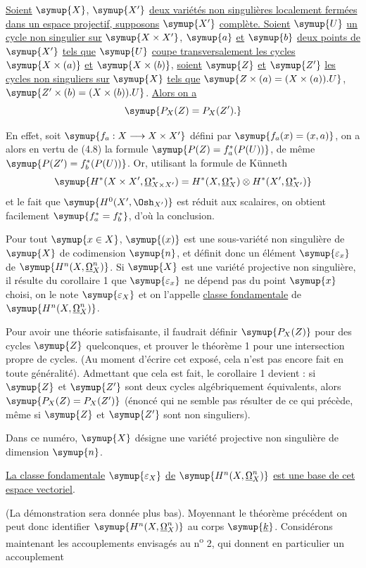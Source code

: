  \uline{Soient} $\symup{X}$, $\symup{X'}$ \uline{deux variétés non singulières
localement fermées dans un espace projectif, supposons} $\symup{X'}$ \uline{complète. Soient} $\symup{U}$
\uline{un cycle non singulier sur} $\symup{X\times X'}$, $\symup{a}$ \uline{et} $\symup{b}$ \uline{deux points de} $\symup{X'}$ \uline{tels que}
$\symup{U}$ \uline{coupe transversalement les cycles} $\symup{X\times(a)}$ \uline{et} $\symup{X\times(b)}$, \uline{soient} $\symup{Z}$
\uline{et} $\symup{Z'}$ \uline{les cycles non singuliers sur} $\symup{X}$ \uline{tels que}
$\symup{Z\times(a)=(X\times(a)).U}$, $\symup{Z'\times(b)=(X\times(b)).U}$.
\uline{Alors on a}
\[
  \symup{P_X(Z)=P_X(Z').}
\]

En effet, soit $\symup{f_a:X\longrightarrow X\times X'}$ défini par
$\symup{f_a(x)=(x,a)}$, on a alors en vertu de (4.8) la formule
$\symup{P(Z)=f_a^{*}(P(U))}$, de même $\symup{P(Z')=f_b^{*}(P(U))}$. Or, utilisant la formule de
Künneth
\[
  \symup{H^{*}(X\times X',\underline{\Omega}_{X\times X'}^{*})
  =H^{*}(X,\underline{\Omega}_X^{*})\otimes H^{*}(X',\underline{\Omega}_{X'}^{*})}
\]
et le fait que $\symup{H^{0}(X',\Osh_{X'})}$ est réduit aux scalaires, on obtient
facilement $\symup{f_a^{*}=f_b^{*}}$, d'où la conclusion.

Pour tout $\symup{x\in X}$, $\symup{(x)}$ est une sous-variété non singulière de $\symup{X}$ de
codimension $\symup{n}$, et définit donc un élément $\symup{\varepsilon_x}$ de
$\symup{H^{n}(X,\underline{\Omega}_X^{n})}$. Si $\symup{X}$ est une variété projective non singulière, il
résulte du corollaire 1 que $\symup{\varepsilon_x}$ ne dépend pas du point $\symup{x}$ choisi, on
le note $\symup{\varepsilon_X}$ et on l'appelle \uline{classe fondamentale} de
$\symup{H^{n}(X,\underline{\Omega}_X^{n})}$.

 Pour avoir une théorie satisfaisante, il faudrait définir
$\symup{P_X(Z)}$ pour des cycles $\symup{Z}$ quelconques, et prouver le théorème 1 pour une
intersection propre de cycles. (Au moment d'écrire cet exposé, cela n'est pas
encore fait en toute généralité). Admettant que cela est fait, le corollaire 1
devient : si $\symup{Z}$ et $\symup{Z'}$ sont deux cycles algébriquement équivalents, alors
$\symup{P_X(Z)=P_X(Z')}$ (énoncé qui ne semble pas résulter de ce qui précède, même si
$\symup{Z}$ et $\symup{Z'}$ sont non singuliers).


Dans ce numéro, $\symup{X}$ désigne une variété projective non singulière de dimension
$\symup{n}$.

 \uline{La classe fondamentale} $\symup{\varepsilon_X}$ \uline{de}
$\symup{H^{n}(X,\underline{\Omega}_X^{n})}$ \uline{est une base de cet espace vectoriel}.

(La démonstration sera donnée plus bas). Moyennant le théorème précédent on peut
donc identifier $\symup{H^{n}(X,\underline{\Omega}_X^{n})}$ au corps $\symup{\underline{k}}$. Considérons maintenant les
accouplements envisagés au n\textsuperscript{o} 2, qui donnent en particulier un
accouplement

